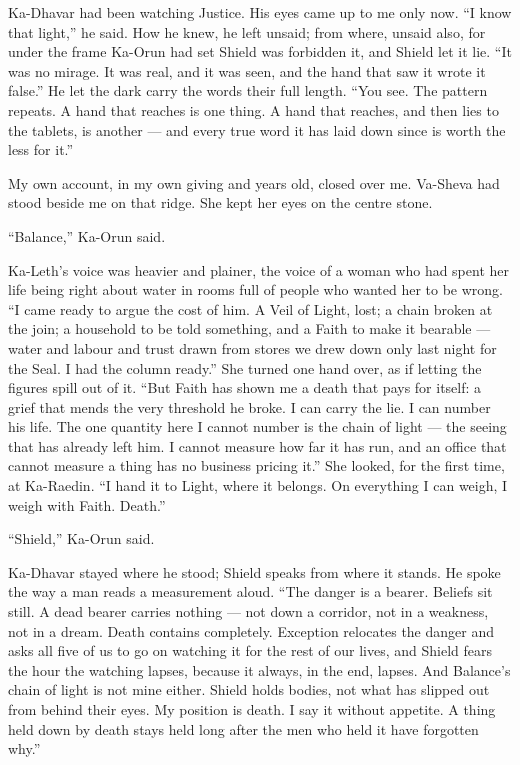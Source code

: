 Ka-Dhavar had been watching Justice. His eyes came up to me only now. ``I know that light,'' he said. How he knew, he left unsaid; from where, unsaid also, for under the frame Ka-Orun had set Shield was forbidden it, and Shield let it lie. ``It was no mirage. It was real, and it was seen, and the hand that saw it wrote it false.'' He let the dark carry the words their full length. ``You see. The pattern repeats. A hand that reaches is one thing. A hand that reaches, and then lies to the tablets, is another --- and every true word it has laid down since is worth the less for it.''\par

My own account, in my own giving and years old, closed over me. Va-Sheva had stood beside me on that ridge. She kept her eyes on the centre stone.\par

``Balance,'' Ka-Orun said.\par

Ka-Leth's voice was heavier and plainer, the voice of a woman who had spent her life being right about water in rooms full of people who wanted her to be wrong. ``I came ready to argue the cost of him. A Veil of Light, lost; a chain broken at the join; a household to be told something, and a Faith to make it bearable --- water and labour and trust drawn from stores we drew down only last night for the Seal. I had the column ready.'' She turned one hand over, as if letting the figures spill out of it. ``But Faith has shown me a death that pays for itself: a grief that mends the very threshold he broke. I can carry the lie. I can number his life. The one quantity here I cannot number is the chain of light --- the seeing that has already left him. I cannot measure how far it has run, and an office that cannot measure a thing has no business pricing it.'' She looked, for the first time, at Ka-Raedin. ``I hand it to Light, where it belongs. On everything I can weigh, I weigh with Faith. Death.''\par

``Shield,'' Ka-Orun said.\par

Ka-Dhavar stayed where he stood; Shield speaks from where it stands. He spoke the way a man reads a measurement aloud. ``The danger is a bearer. Beliefs sit still. A dead bearer carries nothing --- not down a corridor, not in a weakness, not in a dream. Death contains completely. Exception relocates the danger and asks all five of us to go on watching it for the rest of our lives, and Shield fears the hour the watching lapses, because it always, in the end, lapses. And Balance's chain of light is not mine either. Shield holds bodies, not what has slipped out from behind their eyes. My position is death. I say it without appetite. A thing held down by death stays held long after the men who held it have forgotten why.''\par

